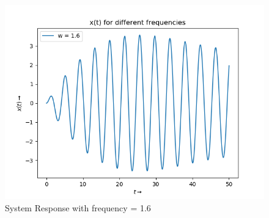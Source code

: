 \documentclass{article}
\begin{document}
\begin{figure}[h!]
\centering
\includegraphics[scale=0.7]{fig7_6.png}
\caption{System Response with frequency = 1.6}
\label{fig:System Response with frequency = 1.6}
\end{figure}
\clearpage
\end{document}
